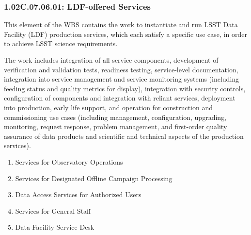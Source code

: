 \subsubsection*{1.02C.07.06.01: LDF-offered Services}

This element of the WBS contains the work to instantiate and run LSST Data Facility (LDF) production services, which each satisfy a specific use case, in order to achieve LSST science requirements.

The work includes integration of all service components, development of verification and validation tests, readiness testing, service-level documentation, integration into service management and service monitoring systems (including feeding status and quality metrics for display), integration with security controls, configuration of components and integration with reliant services, deployment into production, early life support, and operation for construction and commissioning use cases (including management, configuration, upgrading, monitoring, request response, problem management, and first-order quality assurance of data products and scientific and technical aspects of the production services).

\begin{enumerate}

  \item{Services for Observatory Operations}
  \item{Services for Designated Offline Campaign Processing}
  \item{Data Access Services for Authorized Users}
  \item{Services for General Staff}
  \item{Data Facility Service Desk}

\end{enumerate}

